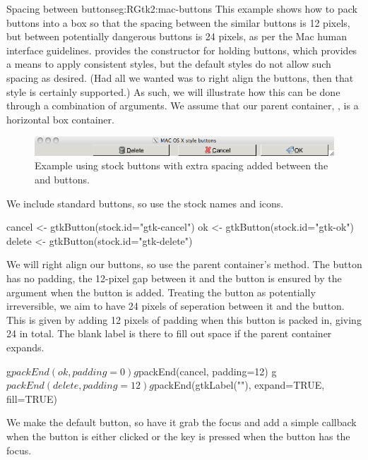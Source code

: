 \begin{example}{Spacing between buttons}{eg:RGtk2:mac-buttons}
This example shows how to pack buttons into a box so that the spacing
between the similar buttons is 12 pixels, but between potentially
dangerous buttons is 24 pixels, as per the Mac human interface
guidelines.
\GTK\/ provides the constructor  for
holding buttons, which provides a means to apply consistent styles,
but the default styles do not allow such spacing as desired. (Had all
we wanted was to right align the buttons, then that style is certainly
supported.) As such, we will illustrate how this can be done through a
combination of  arguments.
We assume that our parent container, , is a
horizontal box container.


\begin{figure}
  \centering
  \includegraphics[width=.7\textwidth]{ex-RGtk2-mac-buttons}
  \caption{Example using stock buttons with extra spacing added between the  and  buttons.}
  \label{fig:ex-RGtk2-mac-buttons}
\end{figure}

We include standard buttons, so use the stock names and icons.
\begin{Schunk}
\begin{Sinput}
 cancel <- gtkButton(stock.id="gtk-cancel")
 ok <- gtkButton(stock.id="gtk-ok")
 delete <- gtkButton(stock.id="gtk-delete")
\end{Sinput}
\end{Schunk}

We will right align our buttons, so use the parent container's
 method. The  button has no padding, the
12-pixel gap between it and the  button is ensured by  the
 argument when the  button is
added. Treating the  button as potentially irreversible,
we aim to have 24 pixels of seperation between it and the
 button. This is given by adding 12 pixels of padding
when this button is packed in, giving 24 in total. The blank label is
there to fill out space if the parent container expands.
\begin{Schunk}
\begin{Sinput}
 g$packEnd(ok, padding=0)
 g$packEnd(cancel, padding=12)
 g$packEnd(delete, padding=12)
 g$packEnd(gtkLabel(""), expand=TRUE, fill=TRUE)
\end{Sinput}
\end{Schunk}
We make  the default button, so have it grab the focus and
add a simple callback when the button is either clicked or the
 key is pressed when the button has the focus.
\begin{Schunk}
\end{Schunk}







\end{example}
